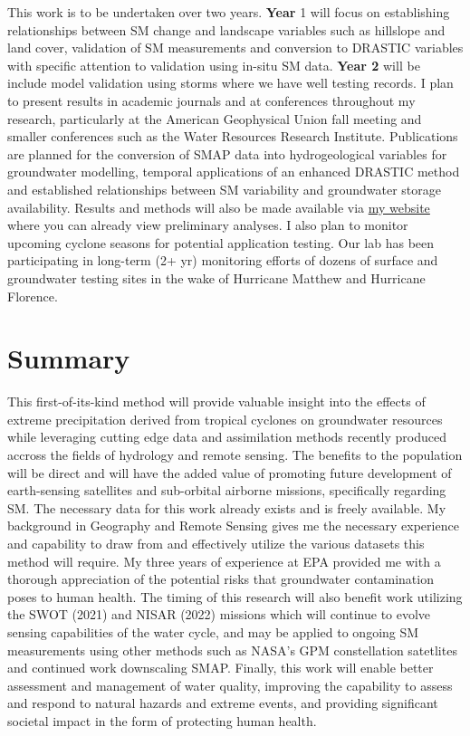 \documentclass[
]{book}
\begin{document}
This work is to be undertaken over two years. \textbf{Year} 1 will focus on establishing relationships between SM change and landscape variables such as hillslope and land cover, validation of SM measurements and conversion to DRASTIC variables with specific attention to validation using in-situ SM data. \textbf{Year 2} will be include model validation using storms where we have well testing records. I plan to present results in academic journals and at conferences throughout my research, particularly at the American Geophysical Union fall meeting and smaller conferences such as the Water Resources Research Institute. Publications are planned for the conversion of SMAP data into hydrogeological variables for groundwater modelling, temporal applications of an enhanced DRASTIC method and established relationships between SM variability and groundwater storage availability. Results and methods will also be made available via \href{AmurrayGeo.com/projects/cyclones/}{my website} where you can already view preliminary analyses. I also plan to monitor upcoming cyclone seasons for potential application testing. Our lab has been participating in long-term (2+ yr) monitoring efforts of dozens of surface and groundwater testing sites in the wake of Hurricane Matthew and Hurricane Florence.

\hypertarget{summary}{%
\chapter{Summary}\label{summary}}

This first-of-its-kind method will provide valuable insight into the effects of extreme precipitation derived from tropical cyclones on groundwater resources while leveraging cutting edge data and assimilation methods recently produced accross the fields of hydrology and remote sensing. The benefits to the population will be direct and will have the added value of promoting future development of earth-sensing satellites and sub-orbital airborne missions, specifically regarding SM. The necessary data for this work already exists and is freely available. My background in Geography and Remote Sensing gives me the necessary experience and capability to draw from and effectively utilize the various datasets this method will require. My three years of experience at EPA provided me with a thorough appreciation of the potential risks that groundwater contamination poses to human health. The timing of this research will also benefit work utilizing the SWOT (2021) and NISAR (2022) missions which will continue to evolve sensing capabilities of the water cycle, and may be applied to ongoing SM measurements using other methods such as NASA's GPM constellation satetlites and continued work downscaling SMAP. Finally, this work will enable better assessment and management of water quality, improving the capability to assess and respond to natural hazards and extreme events, and providing significant societal impact in the form of protecting human health.

  
\end{document}
